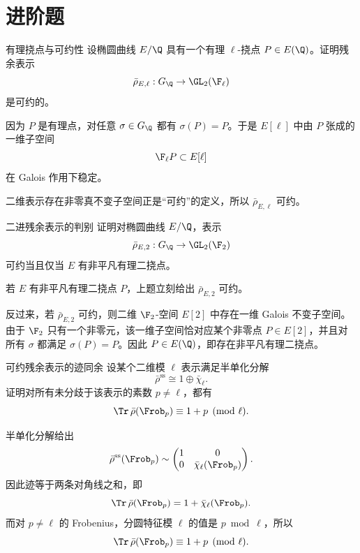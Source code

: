 \section{进阶题 \medium}

\begin{problem}{有理挠点与可约性}
\medium
设椭圆曲线 $E/\Q$ 具有一个有理 $\ell$-挠点 $P\in E(\Q)$。证明残余表示
\[
\bar\rho_{E,\ell}:G_\Q\to\GL_2(\F_\ell)
\]
是可约的。
\end{problem}
\begin{solution}
因为 $P$ 是有理点，对任意 $\sigma\in G_\Q$ 都有 $\sigma(P)=P$。于是 $E[\ell]$ 中由 $P$ 张成的一维子空间
\[
\F_\ell P\subset E[\ell]
\]
在 Galois 作用下稳定。

二维表示存在非零真不变子空间正是“可约”的定义，所以 $\bar\rho_{E,\ell}$ 可约。
\end{solution}

\begin{problem}{二进残余表示的判别}
\medium
证明对椭圆曲线 $E/\Q$，表示
\[
\bar\rho_{E,2}:G_\Q\to\GL_2(\F_2)
\]
可约当且仅当 $E$ 有非平凡有理二挠点。
\end{problem}
\begin{solution}
若 $E$ 有非平凡有理二挠点 $P$，上题立刻给出 $\bar\rho_{E,2}$ 可约。

反过来，若 $\bar\rho_{E,2}$ 可约，则二维 $\F_2$-空间 $E[2]$ 中存在一维 Galois 不变子空间。由于 $\F_2$ 只有一个非零元，该一维子空间恰对应某个非零点 $P\in E[2]$，并且对所有 $\sigma$ 都满足 $\sigma(P)=P$。因此 $P\in E(\Q)$，即存在非平凡有理二挠点。
\end{solution}

\begin{problem}{可约残余表示的迹同余}
\medium
设某个二维模 $\ell$ 表示满足半单化分解
\[
\bar\rho^{\mathrm{ss}}\cong 1\oplus\bar\chi_\ell.
\]
证明对所有未分歧于该表示的素数 $p\neq\ell$，都有
\[
\Tr\,\bar\rho(\Frob_p)\equiv 1+p\pmod \ell.
\]
\end{problem}
\begin{solution}
半单化分解给出
\[
\bar\rho^{\mathrm{ss}}(\Frob_p)\sim
\begin{pmatrix}
1&0\\0&\bar\chi_\ell(\Frob_p)
\end{pmatrix}.
\]
因此迹等于两条对角线之和，即
\[
\Tr\,\bar\rho(\Frob_p)=1+\bar\chi_\ell(\Frob_p).
\]
而对 $p\neq\ell$ 的 Frobenius，分圆特征模 $\ell$ 的值是 $p\bmod\ell$，所以
\[
\Tr\,\bar\rho(\Frob_p)\equiv 1+p\pmod\ell.
\]
\end{solution}

